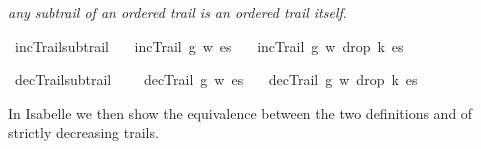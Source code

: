 \begin{isabellebody}
\begin{isamarkuptext}
{\em any subtrail of an ordered trail is an ordered trail itself}.%
\end{isamarkuptext}\isamarkuptrue%
\isamarkupfalse%
\ incTrail{\isacharunderscore}subtrail{\isacharcolon}\isanewline
\ \ \ {\isachardoublequoteopen}incTrail\ g\ w\ es{\isachardoublequoteclose}\isanewline
\ \ \ {\isachardoublequoteopen}incTrail\ g\ w\ {\isacharparenleft}drop\ k\ es{\isacharparenright}{\isachardoublequoteclose}%
\isadelimproof
%
\endisadelimproof
%
\isatagproof
%
\endisatagproof
{\isafoldproof}%
%
\isadelimproof
%
\endisadelimproof
%
\begin{isamarkuptext}%
%
\end{isamarkuptext}\isamarkuptrue%
\isamarkupfalse%
\ decTrail{\isacharunderscore}subtrail{\isacharcolon}\ \isanewline
\ \ \ {\isachardoublequoteopen}decTrail\ g\ w\ es{\isachardoublequoteclose}\isanewline
\ \ \ {\isachardoublequoteopen}decTrail\ g\ w\ {\isacharparenleft}drop\ k\ es{\isacharparenright}{\isachardoublequoteclose}%
\isadelimproof
%
\endisadelimproof
%
\isatagproof
%
\endisatagproof
{\isafoldproof}%
%
\isadelimproof
%
\endisadelimproof
%
\isadelimproof
%
\endisadelimproof
%
\isatagproof
%
\endisatagproof
{\isafoldproof}%
%
\isadelimproof
%
\endisadelimproof
%
\isadelimproof
%
\endisadelimproof
%
\isatagproof
%
\endisatagproof
{\isafoldproof}%
%
\isadelimproof
%
\endisadelimproof
%
\isadelimproof
%
\endisadelimproof
%
\isatagproof
%
\endisatagproof
{\isafoldproof}%
%
\isadelimproof
%
\endisadelimproof
%
\isadelimproof
%
\endisadelimproof
%
\isatagproof
%
\endisatagproof
{\isafoldproof}%
%
\isadelimproof
%
\endisadelimproof
%
\isadelimproof
%
\endisadelimproof
%
\isatagproof
%
\endisatagproof
{\isafoldproof}%
%
\isadelimproof
%
\endisadelimproof
%
\isadelimproof
%
\endisadelimproof
%
\isatagproof
%
\endisatagproof
{\isafoldproof}%
%
\isadelimproof
%
\endisadelimproof
%
\isadelimproof
%
\endisadelimproof
%
\isatagproof
%
\endisatagproof
{\isafoldproof}%
%
\isadelimproof
%
\endisadelimproof
%
\isadelimproof
%
\endisadelimproof
%
\isatagproof
%
\endisatagproof
{\isafoldproof}%
%
\isadelimproof
%
\endisadelimproof
%
\isadelimproof
%
\endisadelimproof
%
\isatagproof
%
\endisatagproof
{\isafoldproof}%
%
\isadelimproof
%
\endisadelimproof
%
\isadelimproof
%
\endisadelimproof
%
\isatagproof
%
\endisatagproof
{\isafoldproof}%
%
\isadelimproof
%
\endisadelimproof
%
\begin{isamarkuptext}%
In Isabelle we then show the equivalence between the two definitions  and  of strictly decreasing trails.

\end{isamarkuptext}
\end{isabellebody}
